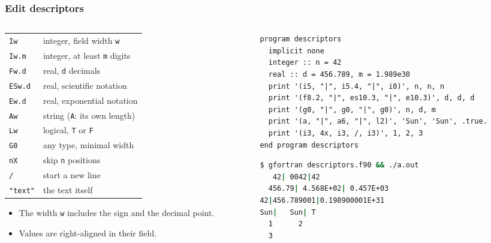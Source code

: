 \begin{frame}[fragile]
  \frametitle{Edit descriptors}
  \begin{columns}[T]
    \begin{column}{0.45\textwidth}
      \small
      \begin{tabular}{@{}ll@{}}
        \texttt{Iw}     & integer, field width \texttt{w} \\
        \texttt{Iw.m}   & integer, at least \texttt{m} digits \\
        \texttt{Fw.d}   & real, \texttt{d} decimals \\
        \texttt{ESw.d}  & real, scientific notation \\
        \texttt{Ew.d}   & real, exponential notation \\
        \texttt{Aw}     & string (\texttt{A}: its own length) \\
        \texttt{Lw}     & logical, \texttt{T} or \texttt{F} \\
        \texttt{G0}     & any type, minimal width \\
        \texttt{nX}     & skip \texttt{n} positions \\
        \texttt{/}      & start a new line \\
        \texttt{"text"} & the text itself \\
      \end{tabular}

      \vspace*{2mm}
      \normalsize
      \begin{itemize}
        \item The width \texttt{w} includes the sign and the decimal point.
        \item Values are right-aligned in their field.
      \end{itemize}
    \end{column}

    \begin{column}{0.55\textwidth}
      \begin{lstlisting}
program descriptors
  implicit none
  integer :: n = 42
  real :: d = 456.789, m = 1.989e30
  print '(i5, "|", i5.4, "|", i0)', n, n, n
  print '(f8.2, "|", es10.3, "|", e10.3)', d, d, d
  print '(g0, "|", g0, "|", g0)', n, d, m
  print '(a, "|", a6, "|", l2)', 'Sun', 'Sun', .true.
  print '(i3, 4x, i3, /, i3)', 1, 2, 3
end program descriptors
      \end{lstlisting}
      \begin{lstlisting}[language=bash]
$ gfortran descriptors.f90 && ./a.out
   42| 0042|42
  456.79| 4.568E+02| 0.457E+03
42|456.789001|0.198900001E+31
Sun|   Sun| T
  1      2
  3
      \end{lstlisting}
    \end{column}
  \end{columns}
\end{frame}


